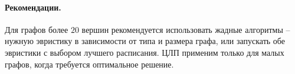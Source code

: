 \paragraph{Рекомендации.}
Для графов более $20$ вершин рекомендуется использовать жадные алгоритмы -- нужную эвристику в зависимости от типа и размера графа, или запускать обе эвристики с выбором лучшего расписания. ЦЛП применим только для малых графов, когда требуется оптимальное решение.